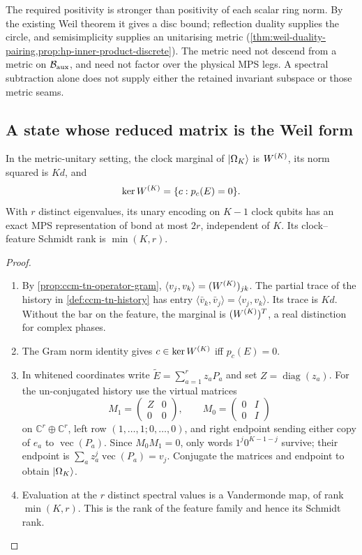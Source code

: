 The required positivity is stronger than positivity of each scalar
ring norm. By the existing Weil theorem it gives a disc bound;
reflection duality supplies the circle, and semisimplicity supplies
an unitarising metric
(\cref{thm:weil-duality-pairing,prop:hp-inner-product-discrete}).
The metric need not descend from a metric on $\mathcal B_{\mathrm{aux}}$, and need not
factor over the physical MPS legs. A spectral subtraction alone does
not supply either the retained invariant subspace or those metric seams.

\subsection{A state whose reduced matrix is the Weil form}

\begin{proposition}
\label{prop:ccm-tn-clock-state}
In the metric-unitary setting, the clock marginal of $|\Omega_K\rangle$
is $W^{(K)}$, its norm squared is $Kd$, and
\[
 \ker W^{(K)}=\{c:p_c(E)=0\}.
\]
With $r$ distinct eigenvalues, its unary encoding on $K-1$ clock
qubits has an exact MPS representation of bond at most $2r$,
independent of $K$. Its clock--feature Schmidt rank is $\min(K,r)$.
\end{proposition}
\begin{proof}
\begin{enumerate}
\item[$\langle1\rangle$1.] By \cref{prop:ccm-tn-operator-gram},
$\langle v_j,v_k\rangle=(W^{(K)})_{jk}$.
The partial trace of the history in \cref{def:ccm-tn-history} has
entry $\langle\bar v_k,\bar v_j\rangle=\langle v_j,v_k\rangle$.
Its trace is $Kd$. Without the bar on the feature, the marginal is
$(W^{(K)})^T$, a real distinction for complex phases.
\item[$\langle1\rangle$2.] The Gram norm identity gives
$c\in\ker W^{(K)}$ iff $p_c(E)=0$.
\item[$\langle1\rangle$3.] In whitened coordinates write
$\widetilde E=\sum_{a=1}^r z_a P_a$ and set $Z=\operatorname{diag}(z_a)$.
For the un-conjugated history use the virtual matrices
\[
 M_1=\begin{pmatrix}Z&0\\0&0\end{pmatrix},\qquad
 M_0=\begin{pmatrix}0&I\\0&I\end{pmatrix}
\]
on $\mathbb C^r\oplus\mathbb C^r$, left row $(1,\ldots,1;0,\ldots,0)$,
and right endpoint sending either copy of $e_a$ to
$\operatorname{vec}(P_a)$.
Since $M_0M_1=0$, only words $1^j0^{K-1-j}$ survive; their endpoint
is $\sum_a z_a^j\operatorname{vec}(P_a)=v_j$.
Conjugate the matrices and endpoint to obtain $|\Omega_K\rangle$.
\item[$\langle1\rangle$4.] Evaluation at the $r$ distinct spectral
values is a Vandermonde map, of rank $\min(K,r)$. This is the rank
of the feature family and hence its Schmidt rank.
\end{enumerate}
\end{proof}

